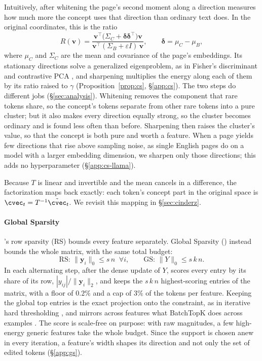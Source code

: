 Intuitively, after whitening the page's second moment along a direction measures how much more the concept uses that direction than ordinary text does.
In the original coordinates, this is the ratio
\begin{equation}
  R(\mathbf{v}) = \frac{\mathbf v^{\top}\big(\Sigma_C + \bm\delta\bm\delta^{\top}\big)\mathbf v}{\mathbf v^{\top}(\Sigma_B + \varepsilon I)\,\mathbf v}, \qquad \bm\delta = \mu_C - \mu_B ,
  \label{eq:rayleigh}
\end{equation}
where $\mu_C$ and $\Sigma_C$ are the mean and covariance of the page's embeddings.
Its stationary directions solve a generalized eigenproblem, as in Fisher's discriminant and contrastive PCA \citep{fisher1936use,abid2018exploring}, and sharpening multiplies the energy along each of them by its ratio raised to $\gamma$ (Proposition~\ref{prop:cs}, \S\ref{app:cs}).
The two steps do different jobs (\S\ref{sec:analysis}).
Whitening removes the component that rare tokens share, so the concept's tokens separate from other rare tokens into a pure cluster; but it also makes every direction equally strong, so the cluster becomes ordinary and is found less often than before.
Sharpening then raises the cluster's value, so that the concept is both pure and worth a feature.
When a page yields few directions that rise above sampling noise, as single English pages do on a model with a larger embedding dimension, we sharpen only those directions; this adds no hyperparameter (\S\ref{app:cs-llama}).

Because $T$ is linear and invertible and the mean cancels in a difference, the factorization maps back exactly: each token's concept part in the original space is $\cvec_t = T^{-1}\tilde\cvec_t$.
We revisit this mapping in \S\ref{sec:cinderz}.

\paragraph{Global Sparsity}
\ember{}'s row sparsity (RS) bounds every feature separately.
Global Sparsity (\gs{}) instead bounds the whole matrix, with the same total budget:
\begin{equation}
  \text{RS: } \|\mathbf y_i\|_0 \le s\,n \;\; \forall i, \qquad \text{GS: } \|Y\|_0 \le s\,k\,n .
  \label{eq:gs}
\end{equation}
In each alternating step, after the dense update of $Y$, \gs{} scores every entry by its share of its row, $|y_{ij}| / \|\mathbf y_i\|_2$, and keeps the $s\,k\,n$ highest-scoring entries of the matrix, with a floor of $0.2\%$ and a cap of $3\%$ of the tokens per feature.
Keeping the global top entries is the exact projection onto the \gs{} constraint, as in iterative hard thresholding \citep{blumensath2009iht}, and mirrors across features what BatchTopK does across examples \citep{bussmann2024batchtopk}.
The score is scale-free on purpose: with raw magnitudes, a few high-energy generic features take the whole budget.
Since the support is chosen anew in every iteration, a feature's width shapes its direction and not only the set of edited tokens (\S\ref{app:gs}).

